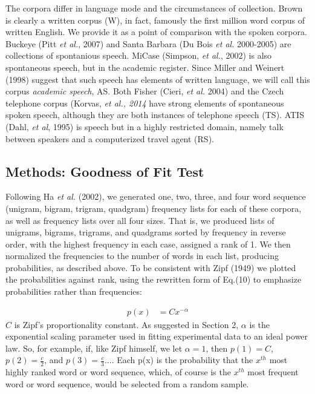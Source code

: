 \documentclass[12pt]{article}
\begin{document}
The corpora differ in language mode and the circumstances of collection.  Brown is clearly a written corpus (W), in fact, famously the first million word corpus of written English. We provide it as a point of comparison with the spoken corpora.  Buckeye (Pitt \emph{et al.}, 2007) and Santa Barbara (Du Bois \emph{et al.} 2000-2005) are collections of spontanious speech.   MiCase (Simpson, \emph{et al.}, 2002) is also spontaneous speech, but in the academic register.  Since Miller and Weinert (1998) suggest that such speech has elements of written language, we will call this corpus \emph{academic speech}, AS.  Both Fisher (Cieri, \emph{et al.} 2004)  and the Czech telephone corpus (Korvas, \emph{et al., 2014} have strong elements of spontaneous spoken speech, although they are both instances of telephone speech (TS).  ATIS (Dahl, \emph{et al}, 1995) is speech but in a highly restricted domain, namely talk between speakers and a computerized travel agent (RS).  
\subsection{Methods: Goodness of Fit Test}


Following Ha \emph{et al.} (2002), we generated one, two, three, and four word sequence (unigram, bigram, trigram, quadgram) frequency lists for each of these corpora, as well as frequency lists over all four sizes.  That is, we produced lists of unigrams, bigrams, trigrams, and quadgrams sorted by frequency in reverse order, with the highest frequency in each case, assigned a rank of 1.  We then normalized the frequencies to the number of words in each list, producing probabilities, as described above.   To be consistent with Zipf (1949) we plotted the probabilities against rank, using the rewritten form of Eq.(10) to emphasize probabilities rather than frequencies:

\begin{align}
p(x) &= Cx^{-\alpha}
\end{align}
$C$ is Zipf's proportionality constant.   As suggested in Section 2, $\alpha$ is the exponential scaling parameter used in fitting experimental data to an ideal power law.  So, for example, if, like Zipf himself, we let $\alpha = 1$, then $p(1) = C$, $p(2)=\frac{c}{2}$, and $p(3)=\frac{c}{3}$.... Each p(x) is the probability that the $x^{th}$ most highly ranked word or word sequence, which, of course is the $x^{th}$ most frequent word or word sequence, would be selected from a random sample.  
\end{document}
